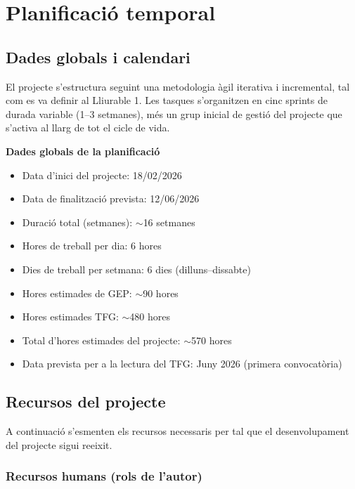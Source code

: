 \documentclass[12pt,a4paper,twoside]{report}
\begin{document}
\chapter{Planificaci\'o temporal}
\label{chap:planificacio}

\section{Dades globals i calendari}
\label{sec:dades-globals}

El projecte s'estructura seguint una metodologia \`agil iterativa i incremental, tal com es va definir al Lliurable 1. Les tasques s'organitzen en cinc sprints de durada variable (1--3 setmanes), m\'es un grup inicial de gesti\'o del projecte que s'activa al llarg de tot el cicle de vida.

\textbf{Dades globals de la planificaci\'o}

\begin{itemize}
    \item Data d'inici del projecte: 18/02/2026
    \item Data de finalitzaci\'o prevista: 12/06/2026
    \item Duraci\'o total (setmanes): $\sim$16 setmanes
    \item Hores de treball per dia: 6 hores
    \item Dies de treball per setmana: 6 dies (dilluns--dissabte)
    \item Hores estimades de GEP: $\sim$90 hores
    \item Hores estimades TFG: $\sim$480 hores
    \item Total d'hores estimades del projecte: $\sim$570 hores
    \item Data prevista per a la lectura del TFG: Juny 2026 (primera convocat\`oria)
\end{itemize}

\section{Recursos del projecte}
\label{sec:recursos}

A continuaci\'o s'esmenten els recursos necessaris per tal que el desenvolupament del projecte sigui reeixit.

\subsection{Recursos humans (rols de l'autor)}
\label{subsec:recursos-humans}
\end{document}
